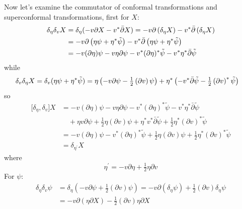 \begin{tcolorbox}[breakable]
	Now let's examine the commutator of conformal transformations and superconformal transformations, first for $X$:
	\begin{align*}
		\delta _{\eta }\delta _{v}X &=\delta _{\eta }(-v\partial X-v^{\ast }\bar{%
			\partial}X)=-v\partial \left( \delta _{\eta }X\right) -v^{\ast }\bar{\partial%
		}\left( \delta _{\eta }X\right)  \\
		&=-v\partial \left( \eta \psi +\eta ^{\ast }\tilde{\psi}\right) -v^{\ast }%
		\bar{\partial}\left( \eta \psi +\eta ^{\ast }\tilde{\psi}\right)  \\
		&=-v(\partial \eta )\psi -v\eta \partial \psi -v^{\ast }(\partial \eta
		)^{\ast }\tilde{\psi}-v^{\ast }\eta ^{\ast }\bar{\partial}\tilde{\psi}
	\end{align*}%
	while
	\begin{align*}
		\delta _{v}\delta _{\eta }X &=\delta _{v}(\eta \psi +\eta ^{\ast }\tilde{%
			\psi})=\eta \left( -v\partial \psi -\tfrac{1}{2}\left( \partial v\right) \psi
		\right) +\eta ^{\ast }\left( -v^{\ast }\bar{\partial}\tilde{\psi}-\tfrac{1}{2}%
		\left( \partial v\right) ^{\ast }\tilde{\psi}\right)
	\end{align*}%
	so
	\begin{align*}
		\lbrack \delta _{\eta },\delta _{v}]X &=-v(\partial \eta )\psi -v\eta
		\partial \psi -v^{\ast }(\partial \eta )^{\ast }\tilde{\psi}-v^{\ast }\eta
		^{\ast }\bar{\partial}\tilde{\psi} \\
		&\quad+\eta v\partial \psi +\tfrac{1}{2}\eta \left( \partial v\right) \psi +\eta
		^{\ast }v^{\ast }\bar{\partial}\tilde{\psi}+\tfrac{1}{2}\eta ^{\ast }\left(
		\partial v\right) ^{\ast }\tilde{\psi} \\
		&=-v(\partial \eta )\psi -v^{\ast }(\partial \eta )^{\ast }\tilde{\psi}+%
		\tfrac{1}{2}\eta \left( \partial v\right) \psi +\tfrac{1}{2}\eta ^{\ast
		}\left( \partial v\right) ^{\ast }\tilde{\psi} \\
		&=\delta _{\eta ^{\prime }}X
	\end{align*}%
	where \[
	\eta ^{\prime }=-v\partial \eta +\tfrac{1}{2}\eta \partial v
	\]%
	For $\psi$:
	\begin{align*}
		\delta _{\eta }\delta _{v} \psi  &=\delta _{\eta }\left( -v\partial \psi +%
		\tfrac{1}{2}(\partial v)\psi \right) =-v\partial \left( \delta _{\eta }\psi
		\right) +\tfrac{1}{2}(\partial v)\delta _{\eta }\psi  \\
		&=-v\partial \left( \eta \partial X\right) -\frac{1}{2}(\partial v)\eta
		\partial X \\

\end{align*}
\end{tcolorbox}
